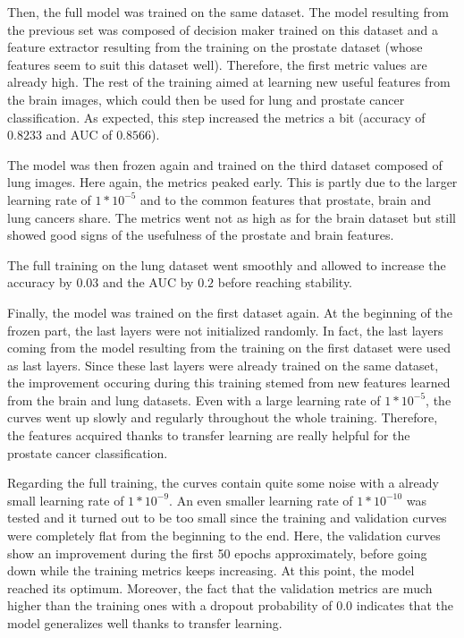 Then, the full model was trained on the same dataset. The model resulting from the previous set was composed of decision maker trained on this dataset and a feature extractor resulting from the training on the prostate dataset (whose features seem to suit this dataset well). Therefore, the first metric values are already high. The rest of the training aimed at learning new useful features from the brain images, which could then be used for lung and prostate cancer classification. As expected, this step increased the metrics a bit (accuracy of $0.8233$ and AUC of $0.8566$).

The model was then frozen again and trained on the third dataset composed of lung images. Here again, the metrics peaked early. This is partly due to the larger learning rate of $1*10^{-5}$ and to the common features that prostate, brain and lung cancers share. The metrics went not as high as for the brain dataset but still showed good signs of the usefulness of the prostate and brain features. 

The full training on the lung dataset went smoothly and allowed to increase the accuracy by $0.03$ and the AUC by $0.2$ before reaching stability. 

Finally, the model was trained on the first dataset again. At the beginning of the frozen part, the last layers were not initialized randomly. In fact, the last layers coming from the model resulting from the training on the first dataset were used as last layers. Since these last layers were already trained on the same dataset, the improvement occuring during this training stemed from new features learned from the brain and lung datasets. Even with a large learning rate of $1*10^{-5}$, the curves went up slowly and regularly throughout the whole training. Therefore, the features acquired thanks to transfer learning are really helpful for the prostate cancer classification. 

Regarding the full training, the curves contain quite some noise with a already small learning rate of $1*10^{-9}$. An even smaller learning rate of $1*10^{-10}$ was tested and it turned out to be too small since the training and validation curves were completely flat from the beginning to the end. Here, the validation curves show an improvement during the first 50 epochs approximately, before going down while the training metrics keeps increasing. At this point, the model reached its optimum. Moreover, the fact that the validation metrics are much higher than the training ones with a dropout probability of 0.0 indicates that the model generalizes well thanks to transfer learning. 


